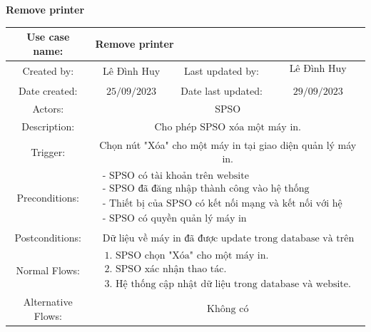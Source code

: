 \vspace{1cm}
\textbf{Remove printer}\par
\begin{tabular}{|c|c|c|c|}
\hline Use case name: & \multicolumn{3}{|l|}{ Remove printer} \\
\hline Created by: & Lê Đình Huy & Last updated by: & $\begin{array}{l}\text { Lê Đình Huy } \\\end{array}$ \\
\hline Date created: & $25 / 09 / 2023$ & Date last updated: & $29 / 09 / 2023$\\
\hline Actors: & \multicolumn{3}{|c|}{ SPSO } \\
\hline Description: & \multicolumn{3}{|c|}{$\begin{array}{l}\text { Cho phép SPSO xóa một máy in. }\end{array}$} \\
\hline Trigger: & \multicolumn{3}{|c|}{ Chọn nút "Xóa" cho một máy in tại giao diện quản lý máy in. } \\
\hline Preconditions: & \multicolumn{3}{|c|}{$\begin{array}{l}\text { - SPSO có tài khoản trên website } \\
\text { - SPSO đã đăng nhập thành công vào hệ thống } \\
\text { - Thiết bị của SPSO có kết nối mạng và kết nối với hệ thống }\\
\text { - SPSO có quyền quản lý máy in }\end{array}$} \\
\hline Postconditions: & \multicolumn{3}{|c|}{$\begin{array}{l}\text { Dữ liệu về máy in đã được update trong database và trên giao diện website.} \end{array}$} \\
\hline Normal Flows: & \multicolumn{3}{|c|}{$\begin{array}{l}\text { 1. SPSO chọn "Xóa" cho một máy in.} \\
\text { 2. SPSO xác nhận thao tác. } \\
\text { 3. Hệ thống cập nhật dữ liệu trong database và website. }\end{array}$} \\
\hline  Alternative Flows: & \multicolumn{3}{|c|}{$\begin{array}{l} 
\text {Không có}\end{array}$} \\

\end{tabular}
